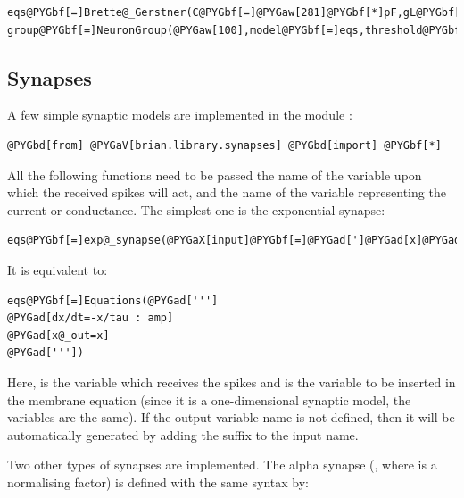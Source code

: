\documentclass[letterpaper,10pt,english]{manual}
\begin{document}
\begin{Verbatim}[commandchars=@\[\]]
eqs@PYGbf[=]Brette@_Gerstner(C@PYGbf[=]@PYGaw[281]@PYGbf[*]pF,gL@PYGbf[=]@PYGaw[30]@PYGbf[*]nS,EL@PYGbf[=]@PYGbf[-]@PYGaw[70.6]@PYGbf[*]mV,VT@PYGbf[=]@PYGbf[-]@PYGaw[50.4]@PYGbf[*]mV,DeltaT@PYGbf[=]@PYGaw[2]@PYGbf[*]mV,tauw@PYGbf[=]@PYGaw[144]@PYGbf[*]ms,a@PYGbf[=]@PYGaw[4]@PYGbf[*]nS)
group@PYGbf[=]NeuronGroup(@PYGaw[100],model@PYGbf[=]eqs,threshold@PYGbf[=]@PYGbf[-]@PYGaw[43]@PYGbf[*]mV,reset@PYGbf[=]AdaptiveReset(Vr@PYGbf[=]@PYGbf[-]@PYGaw[70.6]@PYGbf[*]mvolt,b@PYGbf[=]@PYGaw[0.0805]@PYGbf[*]nA))
\end{Verbatim}


\subsection{Synapses}

A few simple synaptic models are implemented in the module :

\begin{Verbatim}[commandchars=@\[\]]
@PYGbd[from] @PYGaV[brian.library.synapses] @PYGbd[import] @PYGbf[*]
\end{Verbatim}

All the following functions need to be passed the name of the variable upon which the received spikes
will act, and the name of the variable representing the current or conductance.
The simplest one is the exponential synapse:

\begin{Verbatim}[commandchars=@\[\]]
eqs@PYGbf[=]exp@_synapse(@PYGaX[input]@PYGbf[=]@PYGad[']@PYGad[x]@PYGad['],tau@PYGbf[=]@PYGaw[10]@PYGbf[*]ms,unit@PYGbf[=]amp,output@PYGbf[=]@PYGad[']@PYGad[x@_current]@PYGad['])
\end{Verbatim}

It is equivalent to:

\begin{Verbatim}[commandchars=@\[\]]
eqs@PYGbf[=]Equations(@PYGad[''']
@PYGad[dx/dt=-x/tau : amp]
@PYGad[x@_out=x]
@PYGad['''])
\end{Verbatim}

Here,  is the variable which receives the spikes and  is the variable to be inserted in
the membrane equation (since it is a one-dimensional synaptic model, the variables are the same).
If the output variable name is not defined, then it will be automatically generated by adding the
suffix  to the input name.

Two other types of synapses are implemented. The alpha synapse (, where
 is a normalising factor) is defined with the same syntax by:
\end{document}
